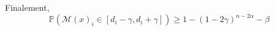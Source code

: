 Finalement,
\[
    \mathbb P\left(  \mathcal M(x)_i \in [d_i - \gamma, d_i + \gamma] \right) \geq 1 - (1-2\gamma)^{n - 2\alpha} - \beta  
\]




